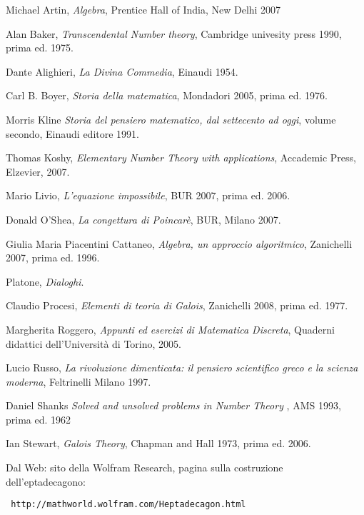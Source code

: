 

\newpage

\begin{thebibliography}{21}

Michael Artin, \emph{Algebra}, Prentice Hall of India, New Delhi 2007 

Alan Baker, \emph{Transcendental Number theory}, Cambridge univesity press 1990, prima ed. 1975.

Dante Alighieri, \emph{La Divina Commedia}, Einaudi 1954.

Carl B. Boyer, \emph{Storia della matematica}, Mondadori 2005, prima ed. 1976.

Morris Kline \emph{Storia del pensiero matematico, dal settecento ad oggi}, volume secondo, Einaudi editore 1991.

Thomas Koshy, \emph{Elementary Number Theory with applications}, Accademic Press, Elzevier, 2007.

Mario Livio, \emph{L'equazione impossibile}, BUR 2007, prima ed. 2006.

Donald O'Shea, \emph{La congettura di Poincarè}, BUR, Milano 2007.

Giulia Maria Piacentini Cattaneo, \emph{Algebra, un approccio algoritmico}, Zanichelli 2007, prima ed. 1996.

Platone, \emph{Dialoghi}.

Claudio Procesi, \emph{Elementi di teoria di Galois}, Zanichelli 2008, prima ed. 1977.

Margherita Roggero, \emph{Appunti ed esercizi di Matematica Discreta}, Quaderni didattici dell'Università di Torino, 2005.

Lucio Russo, \emph{La rivoluzione dimenticata: il pensiero scientifico greco e la scienza moderna}, Feltrinelli Milano 1997.

Daniel Shanks \emph{Solved and unsolved problems in Number Theory }, AMS 1993, prima ed. 1962

Ian Stewart, \emph{Galois Theory}, Chapman and Hall 1973, prima ed. 2006.

Dal Web: sito della Wolfram Research, pagina sulla costruzione dell'eptadecagono:  \begin{verbatim} http://mathworld.wolfram.com/Heptadecagon.html \end{verbatim}


\end{thebibliography}
